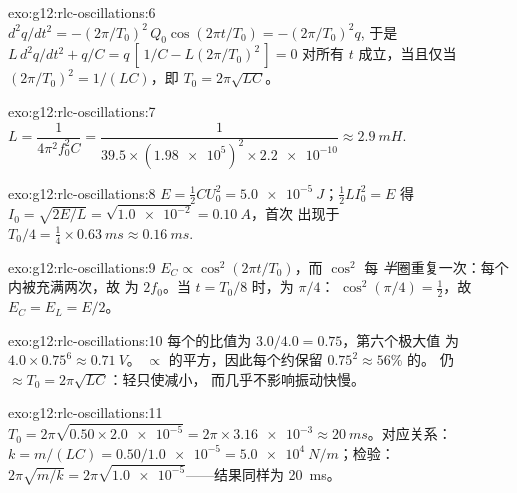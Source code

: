 \begin{solution}{exo:g12:rlc-oscillations:6}
$d^2q/dt^2 = -(2\pi/T_0)^2\,Q_0\cos(2\pi t/T_0) = -(2\pi/T_0)^2 q$,
于是 $L\,d^2q/dt^2 + q/C = q\,[\,1/C - L(2\pi/T_0)^2\,] = 0$ 对所有 $t$
成立，当且仅当 $(2\pi/T_0)^2 = 1/(LC)$，即 $T_0 = 2\pi\sqrt{LC}$。
\end{solution}

\begin{solution}{exo:g12:rlc-oscillations:7}
$L = \dfrac{1}{4\pi^2 f_0^2 C} = \dfrac{1}{39.5 \times
(\num{1.98e5})^2 \times \num{2.2e-10}} \approx \qty{2.9}{mH}$.
\end{solution}

\begin{solution}{exo:g12:rlc-oscillations:8}
$E = \tfrac12 CU_0^2 = \qty{5.0e-5}{J}$；$\tfrac12 LI_0^2 = E$ 得
$I_0 = \sqrt{2E/L} = \sqrt{\num{1.0e-2}} = \qty{0.10}{A}$，首次
出现于 $T_0/4 = \tfrac14 \times \qty{0.63}{ms} \approx
\qty{0.16}{ms}$.
\end{solution}

\begin{solution}{exo:g12:rlc-oscillations:9}
$E_C \propto \cos^2(2\pi t/T_0)$，而 $\cos^2$ 每
\emph{半}圈重复一次：每个内被充满两次，故
为 $2f_0$。当 $t = T_0/8$ 时，为 $\pi/4$：
$\cos^2(\pi/4) = \tfrac12$，故 $E_C = E_L = E/2$。
\end{solution}

\begin{solution}{exo:g12:rlc-oscillations:10}
每个的比值为 $3.0/4.0 = 0.75$，第六个极大值
为 $4.0 \times 0.75^6 \approx \qty{0.71}{V}$。 $\propto$ 
的平方，因此每个约保留 $0.75^2 \approx 56\%$ 的。
仍 $\approx T_0 = 2\pi\sqrt{LC}$：轻只使减小，
而几乎不影响振动快慢。
\end{solution}

\begin{solution}{exo:g12:rlc-oscillations:11}
$T_0 = 2\pi\sqrt{0.50 \times \num{2.0e-5}} = 2\pi \times
\num{3.16e-3} \approx \qty{20}{ms}$。对应关系：$k = m/(LC) =
0.50/\num{1.0e-5} = \qty{5.0e4}{N/m}$；检验：
$2\pi\sqrt{m/k} = 2\pi\sqrt{\num{1.0e-5}}$——结果同样为 \qty{20}{ms}。
\end{solution}

